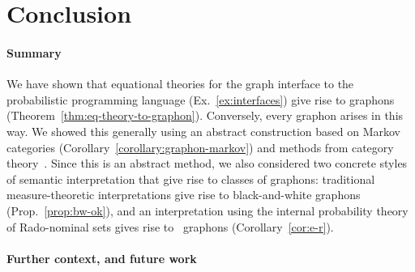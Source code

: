       
\section{Conclusion}
\label{sec:relatedwork}
%
\paragraph{Summary}
We have shown that equational theories for the graph interface to the probabilistic programming language (Ex.~\ref{ex:interfaces}) give rise to graphons (Theorem~\ref{thm:eq-theory-to-graphon}).
Conversely, every graphon arises in this way. We showed this generally using an abstract construction based on Markov categories (Corollary~\ref{corollary:graphon-markov}) and methods from category theory~\cite{hermida-tennent,hu-tholen}. Since this is an abstract method, we also considered two concrete styles of semantic interpretation that give rise to classes of graphons: traditional measure-theoretic interpretations give rise to black-and-white graphons (Prop.~\ref{prop:bw-ok}), and an interpretation using the internal probability theory of Rado-nominal sets gives rise to \ErdosRenyi\ graphons (Corollary~\ref{cor:e-r}).

\paragraph{Further context, and future work}

